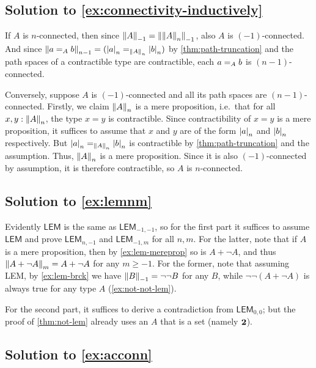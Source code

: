 \documentclass[
%
%
11pt %
]{article}
\begin{document}
\subsection*{Solution to \autoref{ex:connectivity-inductively}}

If $A$ is $n$-connected, then since $\trunc{-1}A = \trunc{-1}{\trunc{n}A}$, also $A$ is $(-1)$-connected.
And since $\trunc{n-1}{\id[A]ab} = (\id[\trunc n A]{\tproj na}{\tproj nb})$ by \autoref{thm:path-truncation} and the path spaces of a contractible type are contractible, each $\id[A]ab$ is $(n-1)$-connected.

Conversely, suppose $A$ is $(-1)$-connected and all its path spaces are $(n-1)$-connected.
Firstly, we claim $\trunc nA$ is a mere proposition, i.e.\ that for all $x,y:\trunc nA$, the type $x=y$ is contractible.
Since contractibility of $x=y$ is a mere proposition, it suffices to assume that $x$ and $y$ are of the form $\tproj na$ and $\tproj nb$ respectively.
But $\id[\trunc n A]{\tproj na}{\tproj nb}$ is contractible by \autoref{thm:path-truncation} and the assumption.
Thus, $\trunc nA$ is a mere proposition.
Since it is also $(-1)$-connected by assumption, it is therefore contractible, so $A$ is $n$-connected.


\subsection*{Solution to \autoref{ex:lemnm}}

Evidently $\mathsf{LEM}$ is the same as $\mathsf{LEM}_{-1,-1}$, so for the first part it suffices to assume $\mathsf{LEM}$ and prove $\mathsf{LEM}_{n,-1}$ and $\mathsf{LEM}_{-1,m}$ for all $n,m$.
For the latter, note that if $A$ is a mere proposition, then by \autoref{ex:lem-mereprop} so is $A+\neg A$, and thus $\trunc m{A+\neg A}= A+\neg A$ for any $m\ge -1$.
For the former, note that assuming LEM, by \autoref{ex:lem-brck} we have $\trunc{-1}{B} = \neg\neg B$ for any $B$, while $\neg\neg(A+\neg A)$ is always true for any type $A$ (\autoref{ex:not-not-lem}).

For the second part, it suffices to derive a contradiction from $\mathsf{LEM}_{0,0}$; but the proof of \autoref{thm:not-lem} already uses an $A$ that is a set (namely $\bool$).

\subsection*{Solution to \autoref{ex:acconn}}
\end{document}
